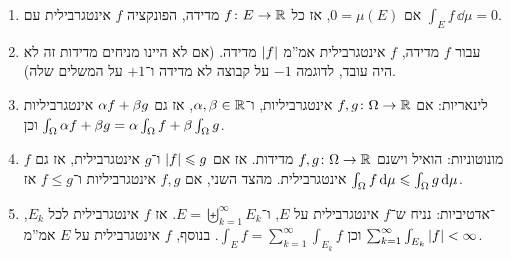 \documentclass[name=רשימות פונקציות ממשיות – WIP]{../../../tex/classes/noChapterMegasumPreamble}
\newcommand\dmu {\,\dd\mu}
\begin{document}
	\begin{Claim}
		\begin{enumerate}
			\item אם $0 = \mu(E)$, אז כל $f \colon E \to \mathbb{R}$ מדידה, הפונקציה $f$ אינטגרבילית עם $\int_E f\dmu = 0$. 
			\item עבור $f$ מדידה, $f$ אינטגרבילית אמ''מ $\left \lvert f \right \rvert$ מדידה. (אם לא היינו מניחים מדידות זה לא היה עובד, לדוגמה $-1$ על קבוצה לא מדידה ו־$+ 1$ על המשלים שלה). 
			\item לינאריות: אם $f, g \colon \Omega \to \mathbb{R}$ אינטגרביליות, ו־$\alpha, \beta \in \mathbb{R}$, אז גם $\alpha f + \beta g$ אינטגרביליות וכן $\int_\Omega \alpha f + \beta g = \alpha \int_\Omega f + \beta \int_\Omega g$. 
			\item מונוטוניות: הואיל וישנם $f, g \colon \Omega \to \mathbb{R}$ מדידות. אז אם $\left \lvert f \right \rvert \leqslant g$ ו־$g$ אינטגרבילית, אז גם $f$ אינטגרבילית. מהצד השני, אם $f, g$ אינטגרביליות ו־$f \le g$ אז $\int_\Og f \dmu \le \int_\Og g \dmu$. 
			\item \ס־אדטיביות: נניח ש־$f$ אינטגרבילית על $E$, ו־$E = \biguplus_{k = 1}^{\infty}E_k$. אז $f$ אינטגרבילית לכל $E_k$, וכן $\int_E f = \sum_{k = 1}^{\infty}\int_{E_k}f$. בנוסף, $f$ אינטגרבילית על $E$ אמ''מ $\sum_{k = 1}^{\infty}\int_{E_k}\left \lvert f \right \rvert < \infty$. 
		\end{enumerate}
	\end{Claim}
\end{document}

